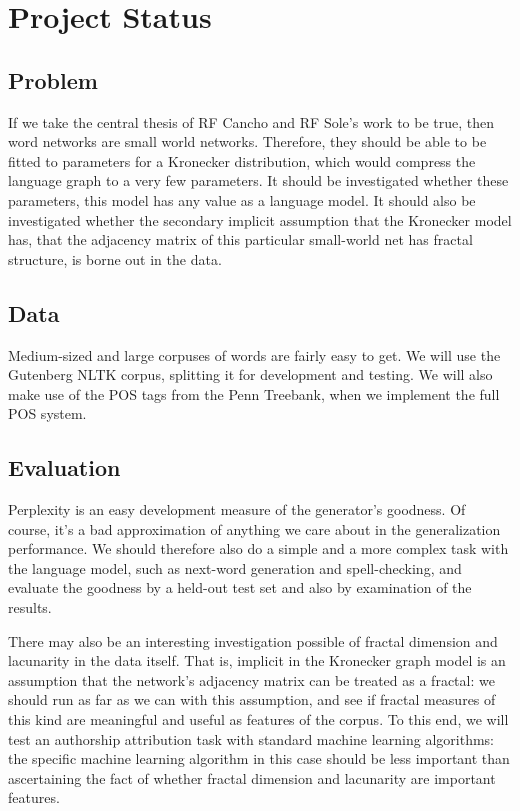 \documentclass[12pt]{article}
\begin{document}
\section{Project Status}

\subsection{Problem}

If we take the central thesis of RF Cancho and RF Sole's work to be true, then word networks are small world networks. Therefore, they should be able to be fitted to parameters for a Kronecker distribution, which would compress the language graph to a very few parameters. It should be investigated whether these parameters, this model has any value as a language model. It should also be investigated whether the secondary implicit assumption that the Kronecker model has, that the adjacency matrix of this particular small-world net has fractal structure, is borne out in the data.

\subsection{Data}
Medium-sized and large corpuses of words are fairly easy to get. We will use the Gutenberg NLTK corpus, splitting it for development and testing. We will also make use of the POS tags from the Penn Treebank, when we implement the full POS system.

\subsection{Evaluation}
Perplexity is an easy development measure of the generator's goodness. Of course, it's a bad approximation of anything we care about in the generalization performance. We should therefore also do a simple and a more complex task with the language model, such as next-word generation and spell-checking, and evaluate the goodness by a held-out test set and also by examination of the results.  %

There may also be an interesting investigation possible of fractal dimension \cite{fractaldim} and lacunarity \cite{lacunarity} in the data itself. That is, implicit in the Kronecker graph model is an assumption that the network's adjacency matrix can be treated as a fractal: we should run as far as we can with this assumption, and see if fractal measures of this kind are meaningful and useful as features of the corpus. To this end, we will test an authorship attribution task with standard machine learning algorithms: the specific machine learning algorithm in this case should be less important than ascertaining the fact of whether fractal dimension and lacunarity are important features.
\end{document}
